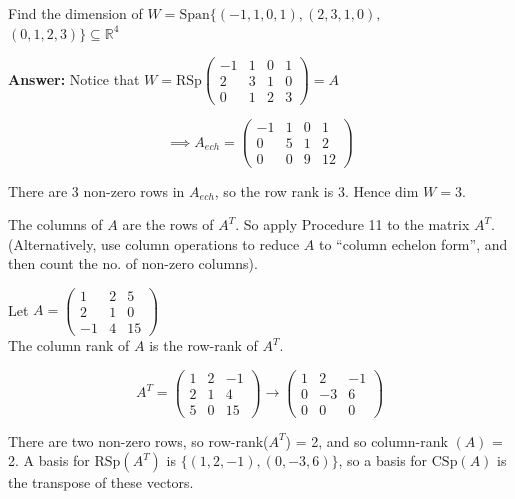 \documentclass[10pt]{scrartcl}
\begin{document}
\begin{example} Find the dimension of $W = \text{Span}\{(-1,1,0,1),(2,3,1,0),$\\$(0,1,2,3)\} \subseteq \mathbb{R}^4$

 \textbf{Answer:} Notice that $W = \text{RSp} \begin{pmatrix}
 -1 & 1 & 0 & 1\\ 2 & 3 & 1 & 0\\ 0 & 1 & 2 & 3
 \end{pmatrix} = A$
 
 \[\implies A_{ech} =  
 \begin{pmatrix}
 -1 & 1 & 0 & 1 \\ 0 & 5 & 1 & 2 \\ 0 & 0 & 9 & 12
 \end{pmatrix}\]
 
There are 3 non-zero rows in $A_{ech}$, so the row rank is 3. Hence dim $W = 3$.
\end{example}\vspace*{5pt}

\begin{proc}The columns of $A$ are the rows of $A^T$. So apply Procedure 11 to the matrix $A^T$. (Alternatively, use column operations to reduce $A$ to ``column echelon form'', and then count the no. of non-zero columns).\end{proc}

\begin{example} Let $A = \begin{pmatrix}
 1 & 2 & 5\\ 2 & 1 & 0\\ -1 &4 & 15
 \end{pmatrix}
 $\\
 
 The column rank of $A$ is the row-rank of $A^T$.
 
 \[A^T = \begin{pmatrix}
 1 & 2 & -1\\ 2 & 1 & 4\\ 5 & 0 & 15
 \end{pmatrix}
 \to 
 \begin{pmatrix}
 1 & 2 & -1\\ 0 & -3 & 6\\ 0 & 0 & 0
 \end{pmatrix}\]
 
 There are two non-zero rows, so row-rank($A^T$) = 2, and so column-rank $(A)$ = 2. A basis for $\text{RSp}(A^T)$ is $\{(1,2,-1),(0,-3,6)\}$, so a basis for $\text{CSp}(A)$ is the transpose of these vectors.
 \end{example}
 
\end{document}
